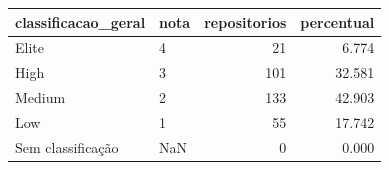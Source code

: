 \begin{tabular}{llrr}
\toprule
classificacao_geral & nota & repositorios & percentual \\
\midrule
Elite & 4 & 21 & 6.774 \\
High & 3 & 101 & 32.581 \\
Medium & 2 & 133 & 42.903 \\
Low & 1 & 55 & 17.742 \\
Sem classificação & NaN & 0 & 0.000 \\
\bottomrule
\end{tabular}
